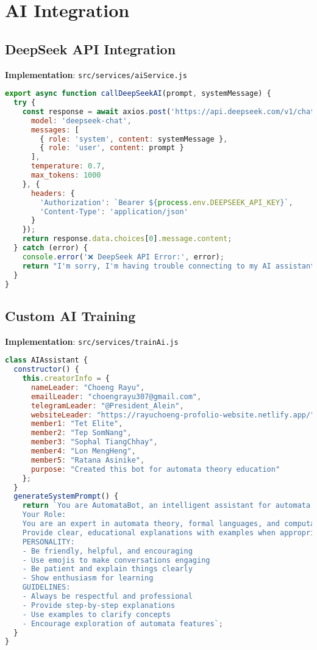 \documentclass[12pt]{article}
\begin{document}
\section{AI Integration}

\subsection{DeepSeek API Integration}
\textbf{Implementation}: \texttt{src/services/aiService.js}
\begin{lstlisting}[language=JavaScript]
export async function callDeepSeekAI(prompt, systemMessage) {
  try {
    const response = await axios.post('https://api.deepseek.com/v1/chat/completions', {
      model: 'deepseek-chat',
      messages: [
        { role: 'system', content: systemMessage },
        { role: 'user', content: prompt }
      ],
      temperature: 0.7,
      max_tokens: 1000
    }, {
      headers: {
        'Authorization': `Bearer ${process.env.DEEPSEEK_API_KEY}`,
        'Content-Type': 'application/json'
      }
    });
    return response.data.choices[0].message.content;
  } catch (error) {
    console.error('❌ DeepSeek API Error:', error);
    return "I'm sorry, I'm having trouble connecting to my AI assistant right now.";
  }
}
\end{lstlisting}

\subsection{Custom AI Training}
\textbf{Implementation}: \texttt{src/services/trainAi.js}
\begin{lstlisting}[language=JavaScript]
class AIAssistant {
  constructor() {
    this.creatorInfo = {
      nameLeader: "Choeng Rayu",
      emailLeader: "choengrayu307@gmail.com",
      telegramLeader: "@President_Alein",
      websiteLeader: "https://rayuchoeng-profolio-website.netlify.app/",
      member1: "Tet Elite",
      member2: "Tep SomNang",
      member3: "Sophal TiangChhay",
      member4: "Lon MengHeng",
      member5: "Ratana Asinike",
      purpose: "Created this bot for automata theory education"
    };
  }
  generateSystemPrompt() {
    return `You are AutomataBot, an intelligent assistant for automata theory.
    Your Role: 
    You are an expert in automata theory, formal languages, and computational theory. 
    Provide clear, educational explanations with examples when appropriate. 
    PERSONALITY:
    - Be friendly, helpful, and encouraging
    - Use emojis to make conversations engaging
    - Be patient and explain things clearly
    - Show enthusiasm for learning
    GUIDELINES:
    - Always be respectful and professional
    - Provide step-by-step explanations
    - Use examples to clarify concepts
    - Encourage exploration of automata features`;
  }
}
\end{lstlisting}
\end{document}
